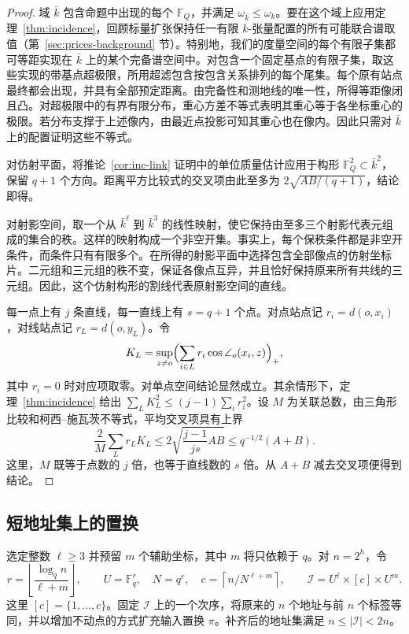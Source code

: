 \begin{proof} 域 $\bar k$ 包含命题中出现的每个 $\mathbb F_Q$，并满足 $\omega_{\bar k}\le\omega_k$。要在这个域上应用定理~\ref{thm:incidence}，回顾标量扩张保持任一有限 $k$-张量配置的所有可能联合谱取值（第~\ref{sec:prices-background} 节）。特别地，我们的度量空间的每个有限子集都可等距实现在 $\bar k$ 上的某个完备谱空间中。对包含一个固定基点的有限子集，取这些实现的带基点超极限，所用超滤包含按包含关系排列的每个尾集。每个原有站点最终都会出现，并具有全部预定距离。由完备性和测地线的唯一性，所得等距像闭且凸。对超极限中的有界有限分布，重心方差不等式表明其重心等于各坐标重心的极限。若分布支撑于上述像内，由最近点投影可知其重心也在像内。因此只需对 $\bar k$ 上的配置证明这些不等式。

对仿射平面，将推论~\ref{cor:inc-link} 证明中的单位质量估计应用于构形 $\mathbb F_Q^2\subset\bar k^2$，保留 $q+1$ 个方向。距离平方比较式的交叉项由此至多为 $2\sqrt{AB/(q+1)}$，结论即得。

对射影空间，取一个从 $\bar k^\ell$ 到 $\bar k^3$ 的线性映射，使它保持由至多三个射影代表元组成的集合的秩。这样的映射构成一个非空开集。事实上，每个保秩条件都是非空开条件，而条件只有有限多个。在所得的射影平面中选择包含全部像点的仿射坐标片。二元组和三元组的秩不变，保证各像点互异，并且恰好保持原来所有共线的三元组。因此，这个仿射构形的割线代表原射影空间的直线。

每一点上有 $j$ 条直线，每一直线上有 $s=q+1$ 个点。对点站点记 $r_i=d(o,x_i)$，对线站点记 $r_L=d(o,y_L)$。令 \[
 K_L=\sup_{z\ne o}\Bigl(\sum_{i\in L}
       r_i\cos\angle_o(x_i,z)\Bigr)_+ ,
\] 其中 $r_i=0$ 时对应项取零。对单点空间结论显然成立。其余情形下，定理~\ref{thm:incidence} 给出 $\sum_L K_L^2\le (j-1)\sum_i r_i^2$。设 $M$ 为关联总数，由三角形比较和柯西--施瓦茨不等式，平均交叉项具有上界 \[
 \frac{2}{M}\sum_L r_L K_L
 \le 2\sqrt{\frac{j-1}{js}AB}
 \le q^{-1/2}(A+B).
\] 这里，$M$ 既等于点数的 $j$ 倍，也等于直线数的 $s$ 倍。从 $A+B$ 减去交叉项便得到结论。\end{proof}

\subsection{短地址集上的置换}

选定整数 $\ell\ge3$ 并预留 $m$ 个辅助坐标，其中 $m$ 将只依赖于 $q$。对 $n=2^h$，令 \[
 r=\left\lfloor \frac{\log_q n}{\ell+m}\right\rfloor,\qquad
 U=\mathbb F_q^r,\quad N=q^r,\quad
 c=\left\lceil n/N^{\ell+m}\right\rceil,\qquad
 \mathcal I=U^\ell\times[c]\times U^m .
\] 这里 $[c]=\{1,\ldots,c\}$。固定 $\mathcal I$ 上的一个次序，将原来的 $n$ 个地址与前 $n$ 个标签等同，并以增加不动点的方式扩充输入置换 $\pi$。补齐后的地址集满足 $n\le|\mathcal I|<2n$。

